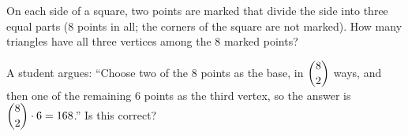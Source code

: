 On each side of a square, two points are marked that divide the side into three equal parts ($8$ points in all; the corners of the square are not marked). How many triangles have all three vertices among the $8$ marked points?

A student argues: ``Choose two of the $8$ points as the base, in $\dbinom82$ ways, and then one of the remaining $6$ points as the third vertex, so the answer is $\dbinom82\cdot6=168$.'' Is this correct?
